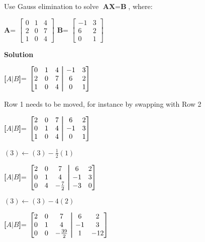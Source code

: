 \begin{exercise}{4} %
Use Gauss elimination to solve $\textbf{AX}=\textbf{B}$, where:
\begin{center}
\textbf{A}= 
$\begin{bmatrix}
0&1&4\\ 
2&0&7\\
1&0&4
\end{bmatrix}
$ 
\textbf{B}= 
$\begin{bmatrix}
-1&3\\ 6&2\\ 0&1
\end{bmatrix}
$ 
\end{center}
\textbf{Solution}\\
\begin{center}
\textbf{[$A \vert B$]}= 
$\begin{bmatrix}
0&1&4 &\aug&-1&3\\ 
2&0&7 &\aug& 6&2\\
1&0&4 &\aug& 0&1
\end{bmatrix}
$ 
\end{center}
Row 1 needs to be moved, for instance by swapping with Row 2\\
\begin{center}
\textbf{[$A \vert B$]}= 
$\begin{bmatrix}
2&0&7 &\aug& 6&2\\
0&1&4 &\aug&-1&3\\ 
1&0&4 &\aug& 0&1
\end{bmatrix}
$ 
\end{center}
$(3) \leftarrow (3) - \frac{1}{2}(1)$
\begin{center}
\textbf{[$A \vert B$]}= 
$\begin{bmatrix}
2&0&7 &\aug& 6&2\\
0&1&4 &\aug&-1&3\\ 
0&4&-\frac{7}{2} &\aug& -3&0
\end{bmatrix}
$
\end{center}
$(3) \leftarrow (3) - 4(2)$
\begin{center}
\textbf{[$A \vert B$]}= 
$\begin{bmatrix}
2&0&7 &\aug& 6&2\\
0&1&4 &\aug&-1&3\\ 
0&0&-\frac{39}{2} &\aug&1&-12
\end{bmatrix}
$ 
\end{center}

\end{exercise}
